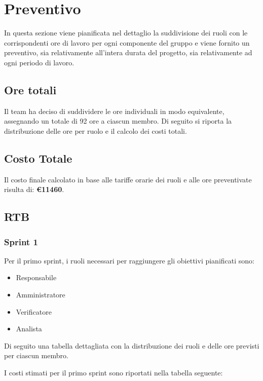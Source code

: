 \section{Preventivo}
In questa sezione viene pianificata nel dettaglio la suddivisione dei ruoli con
le corrispondenti ore di lavoro per ogni componente del gruppo e viene fornito
un preventivo, sia relativamente all'intera durata del progetto, sia
relativamente ad ogni periodo di lavoro.

\subsection{Ore totali}
Il team ha deciso di suddividere le ore individuali in modo equivalente,
assegnando un totale di 92 ore a ciascun membro. Di seguito si riporta la
distribuzione delle ore per ruolo e il calcolo dei costi totali.




\subsection{Costo Totale}
Il costo finale calcolato in base alle tariffe orarie dei ruoli e alle ore
preventivate risulta di: \textbf{\euro 11460}.

\subsection{RTB}

\subsubsection{Sprint 1}
Per il primo sprint, i ruoli necessari per raggiungere gli obiettivi
pianificati sono:
\begin{itemize}
    \item Responsabile
    \item Amministratore
    \item Verificatore
    \item Analista
\end{itemize}

\newpage
Di seguito una tabella dettagliata con la distribuzione dei ruoli e delle ore previsti per ciascun membro.




I costi stimati per il primo sprint sono riportati nella tabella seguente:

